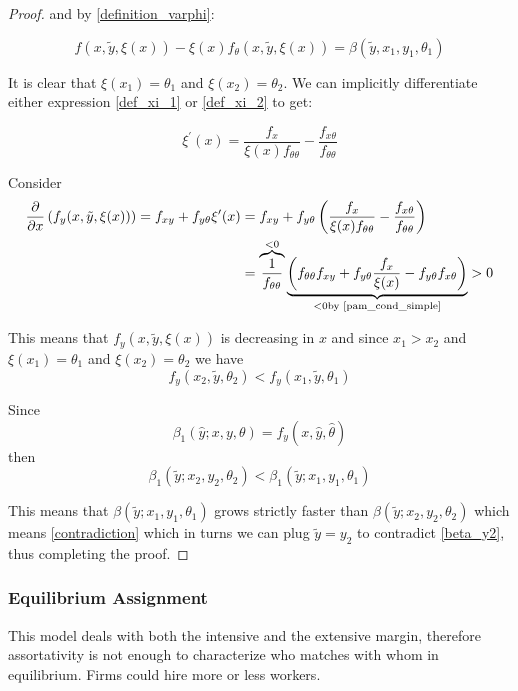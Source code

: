 \documentclass[12pt]{article}
\theoremstyle{definition}
\begin{document}
\begin{proof}
and by \eqref{definition_varphi}:

\begin{equation}\label{def_xi_2}
f(x,\tilde{y},\xi(x)) - \xi(x)f_\theta(x,\tilde{y}, \xi(x)) = \beta(\tilde{y},x_1,y_1,\theta_1)\end{equation}

It is clear that $\xi(x_1) = \theta_1$ and $\xi(x_2) = \theta_2$. We can implicitly differentiate either expression \eqref{def_xi_1} or \eqref{def_xi_2} to get:

\begin{equation}
    \xi^{\prime}(x)=\frac{f_{x}}{\xi(x) f_{\theta \theta}}-\frac{f_{x \theta}}{f_{\theta \theta}}
\end{equation}

Consider 
\begin{align*}
\frac{\partial}{\partial x}\left(f_y(x, \tilde{y}, \xi(x))\right) = f_{xy} +f_{y\theta}\xi'(x) &= f_{xy} + f_{y\theta}\left(\frac{f_{x}}{\xi(x) f_{\theta \theta}}-\frac{f_{x \theta}}{f_{\theta \theta}}\right) \\ &=\overbrace{\frac{1}{f_{\theta \theta}}}^{<0}\underbrace{\left( f_{\theta \theta} f_{xy} +f_{y\theta}\frac{f_{x}}{\xi(x)}-f_{y \theta}f_{x \theta}\right)}_{<0 \text{by \eqref{pam_cond_simple}}}>0
\end{align*}

This means that $f_{y}(x,\tilde{y}, \xi(x))$ is decreasing in $x$ and since $x_1>x_2$ and $\xi(x_1) = \theta_1$ and $\xi(x_2) = \theta_2$ we have $$f_{y}(x_2,\tilde{y}, \theta_2) <f_{y}(x_1,\tilde{y}, \theta_1)$$

Since $$\beta_{1}(\hat{y} ; x, y, \theta)=f_{y}(x, \hat{y}, \hat{\theta})$$ 
 then $$
\beta_{1}\left(\tilde{y} ; x_{2}, y_{2}, \theta_{2}\right)<\beta_{1}\left(\tilde{y} ; x_{1}, y_{1}, \theta_{1}\right)
$$

This means that $\beta(\tilde{y}; x_1,y_1, \theta_1)$ grows strictly faster than $\beta(\tilde{y}; x_2,y_2, \theta_2)$ which means \eqref{contradiction} which in turns we can plug $\tilde{y} = y_2$ to contradict \eqref{beta_y2}, thus completing the proof. 

\end{proof}
\subsubsection{Equilibrium Assignment}
This model deals with both the intensive and the extensive margin, therefore assortativity is not enough to characterize who matches with whom in equilibrium. Firms could hire more or less workers. 
\end{document}
